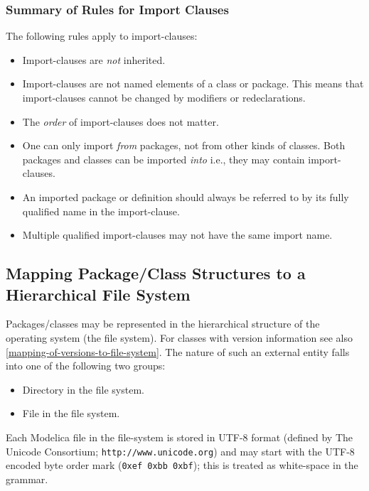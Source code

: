 \subsubsection{Summary of Rules for Import Clauses}\label{summary-of-rules-for-import-clauses}

The following rules apply to import-clauses:
\begin{itemize}
\item
  Import-clauses are \emph{not} inherited.
\item
  Import-clauses are not named elements of a class or package. This
  means that import-clauses cannot be changed by modifiers or
  redeclarations.
\item
  The \emph{order} of import-clauses does not matter.
\item
  One can only import \emph{from} packages, not from other kinds of
  classes. Both packages and classes can be imported \emph{into} i.e.,
  they may contain import-clauses.
\item
  An imported package or definition should always be referred to by its
  fully qualified name in the import-clause.
\item
  Multiple qualified import-clauses may not have the same import name.
\end{itemize}

\subsection{Mapping Package/Class Structures to a Hierarchical File System}\label{mapping-package-class-structures-to-a-hierarchical-file-system}

Packages/classes may be represented in the hierarchical structure of the
operating system (the file system). For classes with version
information see also \cref{mapping-of-versions-to-file-system}. The nature of such an external
entity falls into one of the following two groups:
\begin{itemize}
\item
  Directory in the file system.
\end{itemize}

\begin{itemize}
\item
  File in the file system.
\end{itemize}

Each Modelica file in the file-system is stored in UTF-8 format (defined
by The Unicode Consortium; \lstinline!http://www.unicode.org!) and may start with
the UTF-8 encoded byte order mark (\lstinline!0xef 0xbb 0xbf!); this is treated as
white-space in the grammar.

